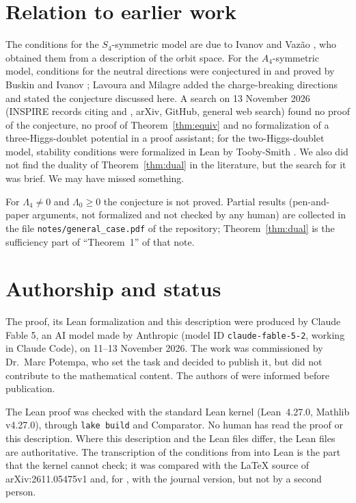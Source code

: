 \documentclass[11pt,a4paper]{amsart}
\theoremstyle{remark}
\newcommand{\La}{\Lambda}
\newcommand{\lean}[1]{\texttt{#1}}
\newcommand{\searchdate}{13 November 2026}
\begin{document}
\section{Relation to earlier work}

The conditions for the $S_4$-symmetric model are due to Ivanov and Vaz\~ao \cite{IV}, who obtained them from a
description of the orbit space. For the $A_4$-symmetric model, conditions for the neutral directions were
conjectured in \cite{IV} and proved by Buskin and Ivanov \cite{BI}; Lavoura and Milagre \cite{LM} added the
charge-breaking directions and stated the conjecture discussed here. A search on \searchdate{} (INSPIRE records
citing \cite{LM} and \cite{IV}, arXiv, GitHub, general web search) found no proof of the conjecture, no proof of
Theorem~\ref{thm:equiv} and no formalization of a three-Higgs-doublet potential in a proof assistant; for the
two-Higgs-doublet model, stability conditions were formalized in Lean by Tooby-Smith \cite{TS}. We also did not
find the duality of Theorem~\ref{thm:dual} in the literature, but the search for it was brief. We may have
missed something.

For $\La_4\neq0$ and $\La_0\ge0$ the conjecture is not proved. Partial results (pen-and-paper arguments, not
formalized and not checked by any human) are collected in the file \lean{notes/general\_case.pdf} of the
repository; Theorem~\ref{thm:dual} is the sufficiency part of ``Theorem~1'' of that note.

\section{Authorship and status}\label{sec:status}

The proof, its Lean formalization and this description were produced by Claude Fable 5, an AI model made by
Anthropic (model ID \texttt{claude-fable-5-2}, working in Claude Code), on 11--13 November 2026. The work was
commissioned by Dr.\ Marc Potempa, who set the task and decided to publish it, but did not contribute to the
mathematical content. The authors of \cite{LM} were informed before publication.

The Lean proof was checked with the standard Lean kernel (Lean~4.27.0, Mathlib v4.27.0), through
\lean{lake build} and Comparator. No human has read the proof or this description. Where this description and
the Lean files differ, the Lean files are authoritative. The transcription of the conditions from \cite{LM} into
Lean is the part that the kernel cannot check; it was compared with the \LaTeX{} source of arXiv:2611.05475v1 and,
for \cite{IV}, with the journal version, but not by a second person.
\end{document}
